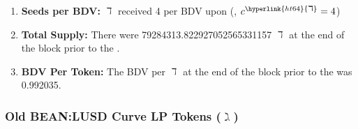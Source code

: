 \documentclass[class=article, crop=false]{standalone}
\begin{document}
\begin{enumerate}
        \item \textbf{Seeds per BDV:} \hyperlink{ht64}{$\daleth$}  received 4  per BDV upon  (, $c^{\hyperlink{ht64}{\daleth}} = 4$)   
        \item \textbf{Total Supply:} There were 79284313.822927052565331157 \hyperlink{ht64}{$\daleth$} at the end of the block prior to the .
        \item \textbf{BDV Per Token:} The BDV per \hyperlink{ht64}{$\daleth$} at the end of the block prior to the  was 0.992035.
    \end{enumerate}
    \subsubsection{Old BEAN:LUSD Curve LP Tokens ($\gimel$)}
\end{document}
